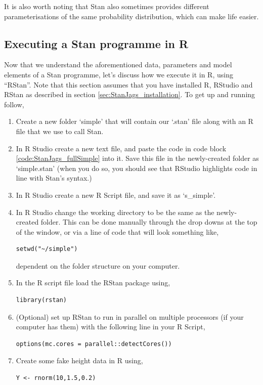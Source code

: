 \documentclass[11pt,fullpage]{book}
\begin{document}
It is also worth noting that Stan also sometimes provides different parameterisations of the same probability distribution, which can make life easier. 

\subsection{Executing a Stan programme in R}
Now that we understand the aforementioned data, parameters and model elements of a Stan programme, let's discuss how we execute it in R, using ``RStan''. Note that this section assumes that you have installed R, RStudio and RStan as described in section \ref{sec:StanJags_installation}. To get up and running follow,

\begin{enumerate}
\item Create a new folder `simple' that will contain our `.stan' file along with an R file that we use to call Stan.
\item In R Studio create a new text file, and paste the code in code block \ref{code:StanJags_fullSimple} into it. Save this file in the newly-created folder as `simple.stan' (when you do so, you should see that RStudio highlights code in line with Stan's syntax.)
\item In R Studio create a new R Script file, and save it as `s\_simple'.
\item In R Studio change the working directory to be the same as the newly-created folder. This can be done manually through the drop downs at the top of the window, or via a line of code that will look something like,
\begin{verbatim}
setwd("~/simple")
\end{verbatim}
dependent on the folder structure on your computer.
\item In the R script file load the RStan package using,
\begin{verbatim}
library(rstan)
\end{verbatim}
\item (Optional) set up RStan to run in parallel on multiple processors (if your computer has them) with the following line in your R Script,
\begin{verbatim}
options(mc.cores = parallel::detectCores())
\end{verbatim}
\item Create some fake height data in R using,
\begin{verbatim}
Y <- rnorm(10,1.5,0.2)
\end{verbatim}

\end{enumerate}
\end{document}
